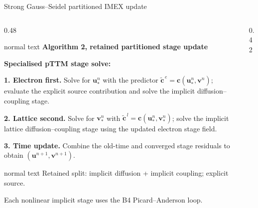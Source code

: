 \documentclass[aspectratio=169,10pt]{beamer}
\begin{document}
\begin{frame}[t]{Strong Gauss--Seidel partitioned IMEX update}
  \hypertarget{supp:numerics-strong-gs}{}
  \vspace{-0.18cm}\hfill
  \hspace{0.10cm}\GVBackupIndexButton
  \vspace{-0.10cm}
  \begin{columns}[T,totalwidth=0.94\textwidth]
    \begin{column}{0.48\textwidth}
      \begin{beamercolorbox}[wd=\linewidth,sep=0.52em]{normal text}
        \small\textbf{\color{GVTeal}Algorithm 2, retained partitioned stage update}\par
        \vspace{0.08cm}
        \scriptsize
        \textbf{Specialised pTTM stage solve:}\par
        \textbf{1. Electron first.} Solve for \(\mathbf u_*^n\) with the predictor \(\tilde{\mathbf c}^{\,e}=\mathbf c(\mathbf u_*^n,\mathbf v^n)\); evaluate the explicit source contribution and solve the implicit diffusion--coupling stage.\par
        \vspace{0.12cm}
        \textbf{2. Lattice second.} Solve for \(\mathbf v_*^n\) with \(\tilde{\mathbf c}^{\,l}=\mathbf c(\mathbf u_*^n,\mathbf v_*^n)\); solve the implicit lattice diffusion--coupling stage using the updated electron stage field.\par
        \vspace{0.12cm}
        \textbf{3. Time update.} Combine the old-time and converged stage residuals to obtain \((\mathbf u^{n+1},\mathbf v^{n+1})\).
      \end{beamercolorbox}
      \vspace{0.08cm}
      \begin{beamercolorbox}[wd=\linewidth,sep=0.38em]{normal text}
        \scriptsize
        Retained split: \textcolor{GVDiffusionGreen}{implicit diffusion} + \textcolor{GVCouplingOrange}{implicit coupling}; \textcolor{GVSourceBlue}{explicit source}.\par
        Each nonlinear implicit stage uses the B4 Picard--Anderson loop.
      \end{beamercolorbox}
    \end{column}
    \begin{column}{0.42\textwidth}

\end{column}
\end{columns}
\end{frame}
\end{document}
